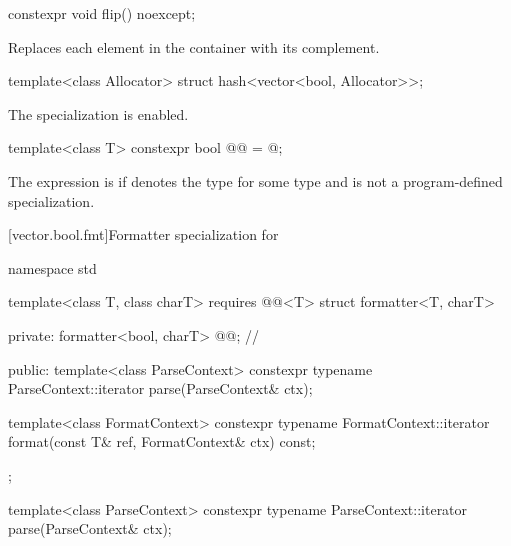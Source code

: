 %
\begin{itemdecl}
constexpr void flip() noexcept;
\end{itemdecl}

\begin{itemdescr}
\pnum
\effects
Replaces each element in the container with its complement.
\end{itemdescr}

\begin{itemdecl}
template<class Allocator> struct hash<vector<bool, Allocator>>;
\end{itemdecl}

\begin{itemdescr}
\pnum
The specialization is enabled.
\end{itemdescr}

%
\begin{itemdecl}
template<class T>
  constexpr bool @@ = @\seebelow@;
\end{itemdecl}

\begin{itemdescr}
\pnum
The expression
 is 
if  denotes the type 
for some type  and
 is not a program-defined specialization.
\end{itemdescr}

[vector.bool.fmt]{Formatter specialization for }

%
\begin{codeblock}
namespace std {
  template<class T, class charT>
    requires @@<T>
  struct formatter<T, charT> {
  private:
    formatter<bool, charT> @@;       // \expos

  public:
    template<class ParseContext>
      constexpr typename ParseContext::iterator
        parse(ParseContext& ctx);

    template<class FormatContext>
      constexpr typename FormatContext::iterator
        format(const T& ref, FormatContext& ctx) const;
  };
}
\end{codeblock}

%
\begin{itemdecl}
template<class ParseContext>
  constexpr typename ParseContext::iterator
    parse(ParseContext& ctx);
\end{itemdecl}

